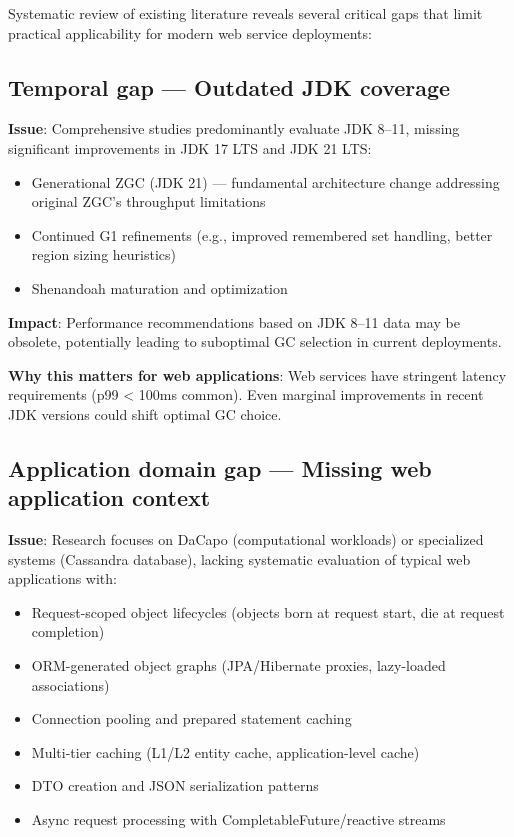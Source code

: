 Systematic review of existing literature reveals several critical gaps that limit practical applicability for modern web service deployments:

\subsection{Temporal gap --- Outdated JDK coverage}
\label{subsec:gap-temporal}

\textbf{Issue}: Comprehensive studies \cite{carpen2015performance, grgic2018comparison} predominantly evaluate JDK 8--11, missing significant improvements in JDK 17 LTS and JDK 21 LTS:
\begin{itemize}
    \item Generational ZGC (JDK 21) --- fundamental architecture change addressing original ZGC's throughput limitations
    \item Continued G1 refinements (e.g., improved remembered set handling, better region sizing heuristics)
    \item Shenandoah maturation and optimization
\end{itemize}

\textbf{Impact}: Performance recommendations based on JDK 8--11 data may be obsolete, potentially leading to suboptimal GC selection in current deployments.

\textbf{Why this matters for web applications}: Web services have stringent latency requirements (p99 < 100ms common). Even marginal improvements in recent JDK versions could shift optimal GC choice.

\subsection{Application domain gap --- Missing web application context}
\label{subsec:gap-domain}

\textbf{Issue}: Research focuses on DaCapo (computational workloads) or specialized systems (Cassandra database), lacking systematic evaluation of typical web applications with:
\begin{itemize}
    \item Request-scoped object lifecycles (objects born at request start, die at request completion)
    \item ORM-generated object graphs (JPA/Hibernate proxies, lazy-loaded associations)
    \item Connection pooling and prepared statement caching
    \item Multi-tier caching (L1/L2 entity cache, application-level cache)
    \item DTO creation and JSON serialization patterns
    \item Async request processing with CompletableFuture/reactive streams
\end{itemize}

